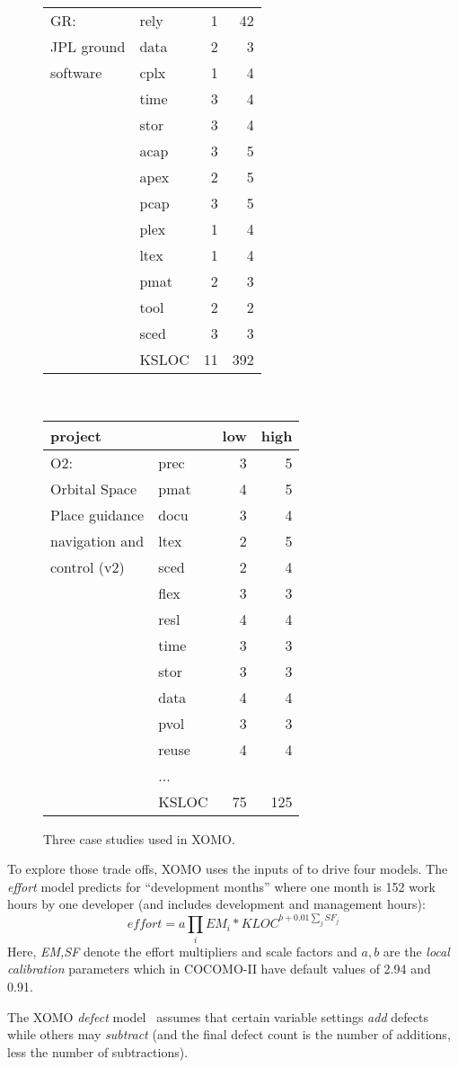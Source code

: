 \begin{figure}[!t]
\begin{tabular}{l@{~}|l@{~}r@{~}r@{~}}
GR:&rely&1&42\\
JPL ground &data&2&3\\
software&cplx&1&4\\
&time&3&4\\
&stor&3&4\\
&acap&3&5\\
&apex&2&5\\
&pcap&3&5\\
&plex&1&4\\
&ltex&1&4\\
&pmat&2&3\\
&tool&2&2\\
&sced&3&3\\
&KSLOC&11&392
\end{tabular}~~~~~~~~~~~~~~~~~~~~~~\begin{tabular}{l@{~}|l@{~}r@{~}r@{~}}
project&&low&high\\\hline
O2:&prec&3&5\\
Orbital Space&pmat&4&5\\
Place guidance&docu&3&4\\
navigation and&ltex&2&5\\
control (v2)&sced&2&4\\
&flex&3&3\\
&resl&4&4\\
&time&3&3\\
&stor&3&3\\
&data&4&4\\
&pvol&3&3\\
&reuse&4&4\\
&...&&\\
&KSLOC&75&125
\end{tabular}
\caption{Three case studies used in XOMO.}\label{fig:xomocases}
\end{figure}

To explore those trade offs, XOMO uses the inputs of 
to drive  four models. The {\em effort} model predicts for 
``development months'' where one month
is 152 work hours by one developer (and includes development and management hours): 
\begin{equation}\label{eq:cocII}
\mathit{effort}=a\prod_i EM_i *\mathit{KLOC}^{b+0.01\sum_j SF_j}
\end{equation}
Here, {\em EM,SF} denote the effort multipliers and scale
factors and
 $a,b$ are the {\em local calibration} parameters which in COCOMO-II
have default values of 2.94 and 0.91.

The XOMO {\em defect}
model~\cite{boehm00b}  assumes that
certain variable settings {\em add} defects while
others may {\em subtract} (and the final defect count is the number of additions, less the
number of subtractions). 

